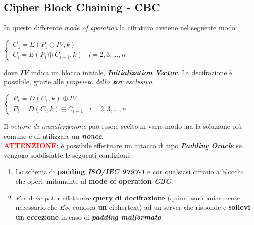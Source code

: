 \newpage
\subsection{Cipher Block Chaining - CBC}
In questo differente \textit{mode of operation} la cifratura avviene nel seguente modo: 
\begin{center}
    \begin{math}
        \begin{cases}
            C_1 = E(P_1 \oplus IV, k) \\
            C_i = E(P_i \oplus C_{i-1}, k)\;\;\;i = 2, 3, ..., n
        \end{cases}
    \end{math}
\end{center}
dove \textbf{\textit{IV}} indica un blocco iniziale, \textbf{\textit{Initialization Vector}}. La decifrazione è possibile, grazie alle \textit{proprietà dello \textbf{xor} esclusivo}.
\begin{center}
    \begin{math}
        \begin{cases}
            P_1 = D(C_1, k) \oplus IV \\
            P_i = D(C_i, k) \oplus C_{i-1} \;\;\;i = 2, 3, ..., n
        \end{cases}
    \end{math}
\end{center}
Il \textit{vettore di inizializzazione} può essere scelto in vario modo ma la soluzione più comune è di utilizzare un \textbf{\textit{nonce}}.
\\ \newline
\textcolor{red}{\textbf{ATTENZIONE}}: è possibile effettuare un attacco di tipo \textbf{\textit{Padding Oracle}} se vengono soddisfatte le seguenti condizioni:
\begin{enumerate}
    \item Lo schema di \textbf{padding \textit{ISO/IEC 9797-1}} e con qualsiasi cifrario a blocchi che operi unitamente al \textbf{mode of operation \textit{CBC}}.
    \item \textit{Eve} deve poter effettuare \textbf{query di decifrazione} (quindi sarà unicamente necessario che \textit{Eve} conosca \textbf{un} ciphertext) ad un server che risponde e \textbf{sollevi un eccezione} in caso di \textbf{\textit{padding malformato}} 
\end{enumerate}

\newpage
